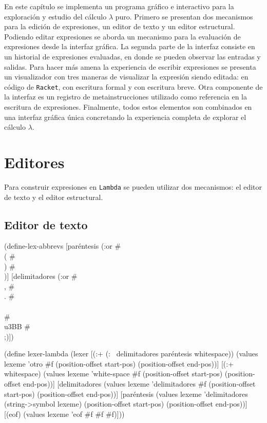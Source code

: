 \documentclass[10pt,oneside,openany,letterpaper]{book}
\begin{document}
En este capítulo se implementa un programa gráfico e interactivo para la exploración y estudio del cálculo \( λ \) puro. Primero se presentan dos mecanismos para la edición de expresiones, un editor de texto y un editor estructural. Podiendo editar expresiones se aborda un mecanismo para la evaluación de expresiones desde la interfaz gráfica. La segunda parte de la interfaz consiste en un historial de expresiones evaluadas, en donde se pueden observar las entradas y salidas. Para hacer más amena la experiencia de escribir expresiones se presenta un visualizador con tres maneras de visualizar la expresión siendo editada: en código de {\tt{}Racket}, con escritura formal y con escritura breve. Otra componente de la interfaz es un registro de metainstrucciones utilizado como referencia en la escritura de expresiones. Finalmente, todos estos elementos son combinados en una interfaz gráfica única concretando la experiencia completa de explorar el cálculo \( λ \).

\section{Editores}

Para construir expresiones en {\tt{}Lambda} se pueden utilizar dos mecanismos: el editor de texto y el editor estructural.

\subsection{Editor de texto}


\nwenddocs{}\endmoddef
(define-lex-abbrevs
  [paréntesis (:or #\\( #\\) #\\[ #\\])]
  [delimitadores (:or #\\, #\\. #\\\\ #\\u3BB #\\;)])

(define lexer-lambda
  (lexer
   [(:+ (:~ delimitadores paréntesis whitespace))
    (values lexeme 'otro #f (position-offset start-pos) (position-offset end-pos))]
   [(:+ whitespace)
    (values lexeme 'white-space #f (position-offset start-pos) (position-offset end-pos))]
   [delimitadores
    (values lexeme 'delimitadores #f (position-offset start-pos) (position-offset end-pos))]
   [paréntesis
    (values lexeme 'delimitadores (string->symbol lexeme) (position-offset start-pos) (position-offset end-pos))]
   [(eof)
    (values lexeme 'eof #f #f #f)]))
\end{document}

